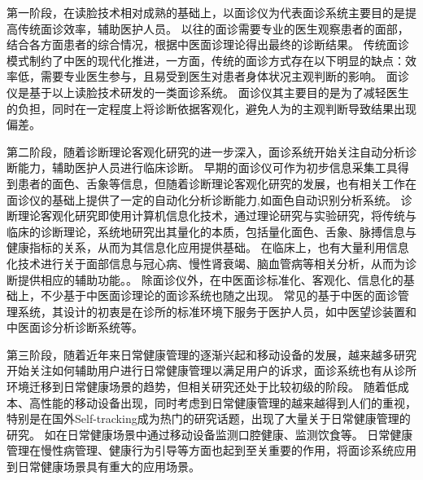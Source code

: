 第一阶段，在读脸技术相对成熟的基础上，以面诊仪为代表面诊系统主要目的是提高传统面诊效率，辅助医护人员\cite{邸丹2016手持式舌象仪的研制, 李丹溪2017舌诊仪的发展及其在舌诊客观化研究中的应用现状}。
以往的面诊需要专业的医生观察患者的面部，结合各方面患者的综合情况，根据中医面诊理论得出最终的诊断结果。
传统面诊模式制约了中医的现代化推进，一方面，传统的面诊方式存在以下明显的缺点：效率低，需要专业医生参与，且易受到医生对患者身体状况主观判断的影响。
面诊仪\cite{邸丹2016手持式舌象仪的研制, 李丹溪2017舌诊仪的发展及其在舌诊客观化研究中的应用现状}是基于以上读脸技术研发的一类面诊系统。
面诊仪其主要目的是为了减轻医生的负担，同时在一定程度上将诊断依据客观化，避免人为的主观判断导致结果出现偏差\cite{李丹溪2017舌诊仪的发展及其在舌诊客观化研究中的应用现状}。


第二阶段，随着诊断理论客观化研究的进一步深入，面诊系统开始关注自动分析诊断能力，辅助医护人员进行临床诊断。
早期的面诊仪可作为初步信息采集工具得到患者的面色、舌象等信息，但随着诊断理论客观化研究的发展，也有相关工作在面诊仪的基础上提供了一定的自动化分析诊断能力,如面色自动识别分析系统\cite{崔骥2018人工智能背景下中医诊疗技术的应用与展望}。
诊断理论客观化研究即使用计算机信息化技术，通过理论研究与实验研究，将传统与临床的诊断理论，系统地研究出其量化的本质，包括量化面色、舌象、脉搏信息与健康指标的关系，从而为其信息化应用提供基础\cite{Wang2013TCM, guo2015analysis, li2020tcminet}。
在临床上，也有大量利用信息化技术进行关于面部信息与冠心病、慢性肾衰竭、脑血管病等相关分析，从而为诊断提供相应的辅助功能\cite{崔骥2018人工智能背景下中医诊疗技术的应用与展望}。。
除面诊仪外，在中医面诊标准化、客观化、信息化的基础上，不少基于中医面诊理论的面诊系统也随之出现。
常见的基于中医的面诊管理系统，其设计的初衷是在诊所的标准环境下服务于医护人员，如中医望诊装置\cite{李国正0一种用于中医望诊的三维图像采集装置}和中医面诊分析诊断系统等\cite{李福凤2016中医面诊分析与诊断系统}。


第三阶段，随着近年来日常健康管理的逐渐兴起和移动设备的发展，越来越多研究开始关注如何辅助用户进行日常健康管理以满足用户的诉求，面诊系统也有从诊所环境迁移到日常健康场景的趋势，但相关研究还处于比较初级的阶段。
随着低成本、高性能的移动设备出现，同时考虑到日常健康管理的越来越得到人们的重视，特别是在国外Self-tracking\cite{sanches2019hci}成为热门的研究话题，出现了大量关于日常健康管理的研究\cite{liang2020oralcam,burgermaster2019personal}。
如在日常健康场景中通过移动设备监测口腔健康\cite{liang2020oralcam}、监测饮食\cite{burgermaster2019personal}等。
日常健康管理在慢性病管理、健康行为引导等方面也起到至关重要的作用，将面诊系统应用到日常健康场景具有重大的应用场景。

